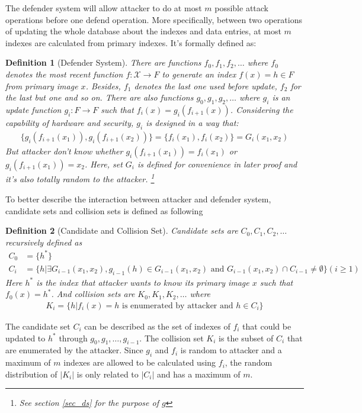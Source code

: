\documentclass[10pt,a4paper]{article}
\newtheorem{mydef}{Definition}
\begin{document}
		The defender system will allow attacker to do at most $m$ possible
		attack operations before one defend operation. More specifically, between
		two operations of updating the whole database about the indexes and data entries,
		at most $m$ indexes are calculated from primary indexes. It's formally defined
		as:
		\begin{mydef}[Defender System]
			There are functions $f_0, f_1, f_2, \ldots$ where
			$f_0$ denotes the most recent function $f: \mathcal{X} \rightarrow F$
			to generate an index $f(x) = h \in F$ from primary image $x$. 
			Besides, $f_1$ denotes the last one used before update, $f_2$ for the last but one and so on.
			There are also functions $g_0, g_1, g_2, \ldots$ where
			$g_i$ is an update function $g_i: F \rightarrow F$ such that
			$f_i(x) = g_i(f_{i+1}(x))$. Considering the capability of hardware and security,
			$g_i$ is designed in a way that:
			\begin{align*}
				\{g_i(f_{i+1}(x_1)), g_i(f_{i+1}(x_2))\} = \{ f_i(x_1), f_i(x_2)\} = G_i(x_1, x_2)
			\end{align*}
			But attacker don't know whether $g_i(f_{i+1}(x_1)) = f_i(x_1)$ or
			$g_i(f_{i+1}(x_1)) = x_2$. 
			Here, set $G_i$ is defined for convenience in later proof and
			it's also totally random
			to the attacker. \footnote{See section \ref{sec_ds} for the purpose
			of $g$}
		\end{mydef}
		
		To better describe the interaction between attacker and defender
		system, candidate sets and collision sets is defined as following
		\begin{mydef}[Candidate and Collision Set]
			Candidate sets are $C_0, C_1, C_2, \ldots$ recursively defined as
			\begin{align*}
				C_0 &= \{h^*\}\\
				C_i &= \{h | \exists G_{i-1}(x_1, x_2),
					g_{i-1}(h) \in G_{i-1}(x_1, x_2) \text{ and } 
					G_{i-1}(x_1, x_2) \cap C_{i-1} \neq \emptyset \} (i \geq 1)
			\end{align*}
			Here $h^*$ is the index that attacker wants to know its primary image
			$x$ such that $f_0(x) = h^*$. And collision sets are $K_0, K_1, K_2, \ldots$ where
			\begin{align*}
				K_i = \{h | f_i(x) = h \text{ is enumerated by attacker and } h \in C_i \}
			\end{align*}
		\end{mydef}
		
		The candidate set $C_i$ can be described as the set of indexes of $f_i$ that could be
		updated to $h^*$ through $g_0, g_1, \ldots, g_{i-1}$. The collision set $K_i$ is the
		subset of $C_i$ that are enumerated by the attacker. Since $g_i$ and $f_i$ is random
		to attacker and a maximum of $m$ indexes are allowed to be calculated using $f_i$, 
		the random distribution of $|K_i|$ is only related to $|C_i|$ and has a maximum
		of $m$. 
		
\end{document}
